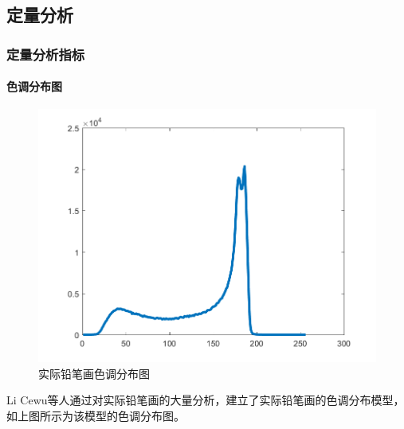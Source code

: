 \documentclass[aspectratio=43, xcolor=svgnames, t, 10pt]{beamer}
\begin{document}
\subsection{定量分析}
\begin{frame}
  \frametitle{定量分析指标}
  \framesubtitle{色调分布图}
  \begin{figure}
    \includegraphics[width=0.6\linewidth]{./figure/sketch_hist-01.png}
    \caption{实际铅笔画色调分布图}
  \end{figure}
  \begin{block}{}
    \textrm{Li Cewu}等人通过对实际铅笔画的大量分析，建立了实际铅笔画的色调分布模型，如上图所示为该模型的色调分布图。
  \end{block}
\end{frame}
\end{document}
